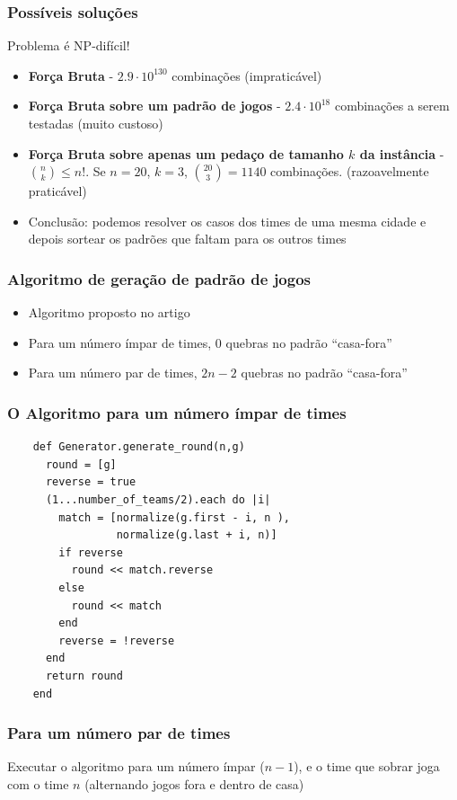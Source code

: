 \documentclass{beamer}
\begin{document}
\begin{frame}
  \frametitle{Possíveis soluções}
  Problema é NP-difícil!
  \begin{itemize}
    \item \textbf{Força Bruta} - $2.9 \cdot 10^{130}$ combinações (impraticável)
    \item \textbf{Força Bruta sobre um padrão de jogos} - $2.4 \cdot 10^{18}$ combinações a serem testadas (muito custoso)
    \item \textbf{Força Bruta sobre apenas um pedaço de tamanho $k$ da instância} - $\binom{n}{k} \le n!$. Se $n = 20$, $k = 3$, 
    $\binom{20}{3} = 1140$ combinações. (razoavelmente praticável)
    \item Conclusão: podemos resolver os casos dos times de uma mesma cidade e depois sortear os padrões que faltam para os outros times
  \end{itemize}
\end{frame}

\begin{frame}
  \frametitle{Algoritmo de geração de padrão de jogos}
  \begin{itemize}
    \item Algoritmo proposto no artigo \cite{holandes}
    \item Para um número ímpar de times, $0$ quebras no padrão ``casa-fora''
    \item Para um número par de times, $2n-2$ quebras no padrão ``casa-fora''
  \end{itemize}
\end{frame}

\begin{frame}[fragile]
  \frametitle{O Algoritmo para um número ímpar de times}
\begin{verbatim}
    def Generator.generate_round(n,g)
      round = [g]
      reverse = true
      (1...number_of_teams/2).each do |i|
        match = [normalize(g.first - i, n ),
                 normalize(g.last + i, n)]
        if reverse
          round << match.reverse
        else
          round << match
        end
        reverse = !reverse
      end
      return round
    end
\end{verbatim}
\end{frame}

\begin{frame}
  \frametitle{Para um número par de times}
    Executar o algoritmo para um número ímpar ($n-1$), e o time que sobrar joga com o time $n$ (alternando jogos fora e dentro de casa)
\end{frame}
\end{document}
